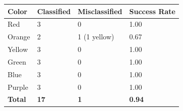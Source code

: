 \documentclass[twoside]{IEEEtran}
\begin{document}
\begin{table}[!b]
\begin{minipage}{\columnwidth}
\begin{tabular}{ l l l l }
            \toprule
            \bfseries Color & \bfseries Classified & \bfseries Misclassified & \bfseries Success Rate \\
            \midrule
            Red             & 3                    & 0                       & 1.00                   \\
            Orange          & 2                    & 1 (1 yellow)            & 0.67                   \\
            Yellow          & 3                    & 0                       & 1.00                   \\
            Green           & 3                    & 0                       & 1.00                   \\
            Blue            & 3                    & 0                       & 1.00                   \\
            Purple          & 3                    & 0                       & 1.00                   \\
            \midrule
            \bfseries Total & \bfseries 17         & \bfseries 1             & \bfseries 0.94         \\
            \bottomrule
        \end{tabular}
    \end{minipage}

    \bigskip


\end{table}
\end{document}
